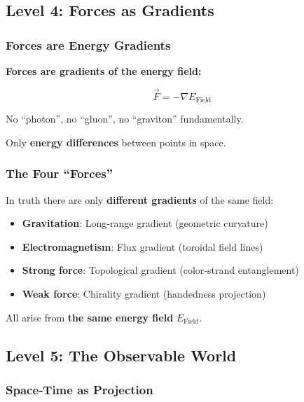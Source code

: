 	\subsection{Level 4: Forces as Gradients}

	\subsubsection{Forces are Energy Gradients}

	\begin{keyresult}
		\textbf{Forces are gradients of the energy field:}

		\begin{equation}
			\boxed{\vec{F} = -\nabla E_{\text{Field}}}
		\end{equation}

		\vspace{0.3cm}

		No \enquote{photon}, no \enquote{gluon}, no \enquote{graviton} fundamentally.

		Only \textbf{energy differences} between points in space.
	\end{keyresult}

	\subsubsection{The Four \enquote{Forces}}

	In truth there are only \textbf{different gradients} of the same field:

	\begin{itemize}
		\item \textbf{Gravitation}: Long‑range gradient (geometric curvature)
		\item \textbf{Electromagnetism}: Flux gradient (toroidal field lines)
		\item \textbf{Strong force}: Topological gradient (color‑strand entanglement)
		\item \textbf{Weak force}: Chirality gradient (handedness projection)
	\end{itemize}

	All arise from \textbf{the same energy field} $E_{\text{Field}}$.

	\subsection{Level 5: The Observable World}

	\subsubsection{Space‑Time as Projection}

